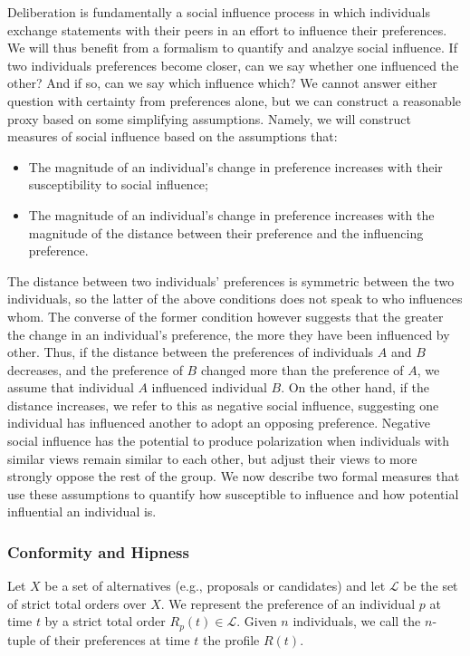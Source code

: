 Deliberation is fundamentally a social influence process in which
individuals exchange statements with their peers in an effort to influence their preferences.
We will thus benefit from a formalism to quantify and analzye social influence.
If two individuals preferences become closer, can we say whether one influenced the other? And if so, can we say which influence which?
We cannot answer either question with certainty from preferences alone, but we can construct a reasonable proxy based on some simplifying assumptions.
Namely, we will construct measures of social influence based on the assumptions that:
\begin{itemize}
    \item The magnitude of an individual's change in preference increases with their susceptibility to social influence;
    \item The magnitude of an individual's change in preference increases with the magnitude of the distance between their preference and the influencing preference.
\end{itemize}
The distance between two individuals' preferences is symmetric between the two individuals,
so the latter of the above conditions does not speak to who influences whom.
The converse of the former condition however suggests that the greater the change in an individual's preference,
the more they have been influenced by other.
Thus, if the distance between the preferences of individuals $A$ and $B$ decreases, and the preference of $B$ changed more than the preference of $A$, we assume that individual $A$ influenced individual $B$.
On the other hand, if the distance increases, we refer to this as negative social influence, suggesting one individual has influenced another to adopt an opposing preference.
Negative social influence has the potential to produce polarization when individuals with similar views
remain similar to each other, but adjust their views to more strongly oppose the rest of the group.
We now describe two formal measures that use these assumptions to quantify how susceptible to influence and how potential influential an individual is.

\subsubsection{Conformity and Hipness}

Let $X$ be a set of alternatives (e.g., proposals or candidates)
and let $\mathcal{L}$ be the set of strict total orders over $X$.
We represent the preference of an individual $p$ at time $t$
by a strict total order $R_p(t) \in \mathcal{L}$.
Given $n$ individuals, we call the $n$-tuple of their preferences
at time $t$ the profile $R(t)$.

